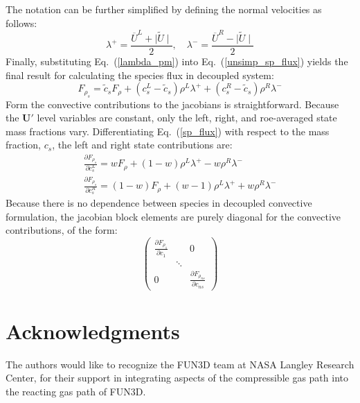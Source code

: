 \documentclass[]{aiaa-tc}%
\begin{document}
%
The notation can be further simplified by defining the normal velocities as follows:
%
\begin{equation}
\label{lambda_pm}
	\lambda^+ = \frac{\overline{U}^L+\mid \tilde{U}\mid}{2}, \quad 
	\lambda^- = \frac{\overline{U}^R-\mid \tilde{U}\mid}{2}
\end{equation}
%
Finally, substituting Eq.~(\ref{lambda_pm}) into Eq.~(\ref{unsimp_sp_flux}) yields the final result for calculating the species flux in decoupled system:
%
\begin{equation}
\label{sp_flux}
	F_{\rho_s} =\tilde{c}_s F_\rho + (c_s^L-\tilde{c}_s)\rho^L\lambda^+
	+ (c_s^R-\tilde{c}_s)\rho^R\lambda^-
\end{equation}
%
Form the convective contributions to the jacobians is straightforward.   Because the $\mathbf{U}'$ level variables are constant, only the left, right, and roe-averaged state mass fractions vary.  Differentiating Eq.~(\ref{sp_flux}) with respect to the mass fraction, $c_s$, the left and right state contributions are:
%
\begin{gather}
	\frac{\partial F_{\rho_s}}{\partial c^L_s} = wF_\rho+(1-w)\rho^L\lambda^+ - w\rho^R\lambda^- \\
	\frac{\partial F_{\rho_s}}{\partial c^R_s} = (1-w)F_\rho+(w-1)\rho^L\lambda^+ + w\rho^R\lambda^-
\end{gather}
%
Because there is no dependence between species in decoupled convective formulation, the jacobian block elements are purely diagonal for the convective contributions, of the form:
%
\begin{equation}
	\begin{pmatrix}
		\frac{\partial F_{\rho_1}}{\partial c_1} & & 0 \\
		 & \ddots &  \\
		 0 & & \frac{\partial F_{\rho_{ns}}}{\partial c_{ns}}
	\end{pmatrix}
\end{equation}

\section*{Acknowledgments}

The authors would like to recognize the FUN3D team at NASA Langley Research Center, for their support in integrating aspects of the compressible gas path into the reacting gas path of FUN3D.



\end{document}
